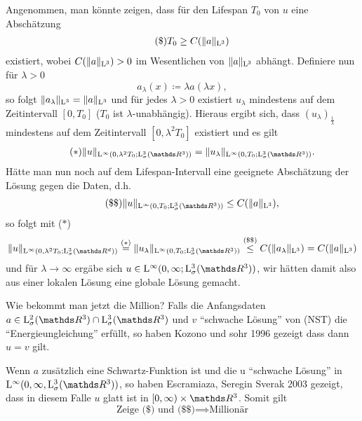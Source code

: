 Angenommen, man könnte zeigen, dass für den Lifespan $T_0$ von $u$ eine Abschätzung
\begin{align*}
  \tag{\$} T_0 \geq C(\|a\|_{\mathrm{L}^3})
\end{align*}
existiert, wobei $C(\|a\|_{\mathrm{L}^3}) > 0$ im Wesentlichen von $\|a\|_{\mathrm{L}^3}$ abhängt.
Definiere nun für $\lambda > 0$
$$
a_\lambda(x) \coloneqq \lambda a(\lambda x),
$$
so folgt $\|a_\lambda\|_{\mathrm{L}^3} = \|a\|_{\mathrm{L}^3}$ und für jedes $\lambda > 0$ existiert $u_\lambda$ mindestens auf dem Zeitintervall $[0,T_0]$ ($T_0$ ist $\lambda$-unabhängig).
Hieraus ergibt sich, dass $(u_\lambda)_{\frac{1}{\lambda}}$ mindestens auf dem Zeitintervall $[0,\lambda^2 T_0]$ existiert und es gilt
\begin{align*}
  \tag{$\ast$} \|u\|_{\Ell^\infty(0,\lambda^2 T_0; \Ell^3_\sigma(\R^3))} = \|u_\lambda\|_{\Ell^\infty(0,T_0; \Ell^3_\sigma(\R^3))}.
\end{align*} 
Hätte man nun noch auf dem Lifespan-Intervall eine geeignete Abschätzung der Lösung gegen die Daten, d.h.
\begin{align*}
  \tag{\$\$} \|u\|_{\Ell^\infty(0,T_0; \Ell^3_\sigma(\R^3))} \leq C(\|a\|_{\Ell^3}),
\end{align*}
so folgt mit ($\ast$)
$$
\|u\|_{\Ell^\infty(0,\lambda^2 T_0; \Ell^3_\sigma(\R^d))}
\overset{\text{($\ast$)}}{=} \|u_\lambda\|_{\Ell^\infty(0,T_0; \Ell^3_\sigma(\R^3))}
\overset{\text{(\$\$)}}{\leq} C(\|a_\lambda\|_{\Ell^3}) = C(\|a\|_{\Ell^3})
$$
und für $\lambda \to \infty$ ergäbe sich $u \in \Ell^\infty(0,\infty; \Ell^3_\sigma(\R^3))$, wir hätten damit also aus einer lokalen Lösung eine globale Lösung gemacht.

Wie bekommt man jetzt die Million?
Falls die Anfangsdaten $a \in \Ell^2_\sigma(\R^3) \cap \Ell^3_\sigma(\R^3)$ und $v$ ``schwache Lösung'' von (NST) die ``Energieungleichung'' erfüllt, so haben Kozono und sohr 1996 gezeigt dass dann $u = v$ gilt.

Wenn $a$ zusätzlich eine Schwartz-Funktion ist und die u ``schwache Lösung'' in $\Ell^\infty(0,\infty,\Ell^3_\sigma(\R^3))$, so haben Escramiaza, Seregin Sverak 2003 gezeigt, dass in diesem Falle $u$ glatt ist in $[0,\infty) \times \R^3$. Somit gilt
$$
\text{Zeige (\$) und (\$\$)} \implies \text{Millionär}
$$

